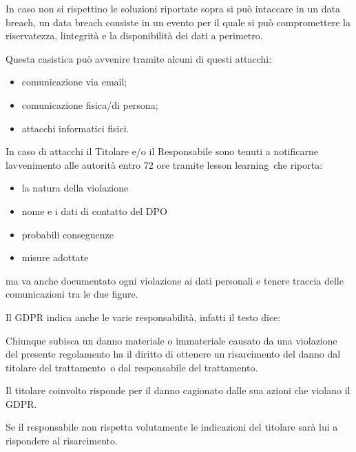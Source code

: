 \documentclass[
]{article}
\providecommand{\tightlist}{%
  \setlength{\itemsep}{0pt}\setlength{\parskip}{0pt}}
\begin{document}
{}

{In caso non si rispettino le soluzioni riportate sopra si può intaccare
in un data breach, un data breach consiste in un evento per il quale si
può compromettere la riservatezza, l\textquotesingle integrità e la
disponibilità dei dati a perimetro. }

{Questa casistica può avvenire tramite alcuni di questi attacchi:}

\begin{itemize}
\tightlist
\item
  {comunicazione via email}{;}
\item
  {comunicazione fisica/di persona}{;}
\item
  {attacchi informatici fisici}{.}
\end{itemize}

{}

{In caso di attacchi il Titolare e/o il Responsabile sono tenuti a
notificarne l\textquotesingle avvenimento alle autorità entro 72 ore
tramite }{lesson learning}{~che riporta:}

\begin{itemize}
\tightlist
\item
  {la natura della violazione }
\item
  {nome e i dati di contatto del DPO }
\item
  {probabili conseguenze }
\item
  {misure adottate }
\end{itemize}

{ma va anche documentato ogni violazione ai dati personali e tenere
traccia delle comunicazioni tra le due figure.}

{}

{Il GDPR indica anche le varie responsabilità, infatti il testo dice:}

{}

{Chiunque subisca un danno materiale o immateriale causato da una
violazione del presente regolamento ha il diritto di ottenere un
risarcimento del danno dal }{titolare del trattamento}{~o dal
}{responsabile del trattamento}{.}

{}

{Il }{titolare }{coinvolto risponde per il danno cagionato dalle sua
azioni che violano il GDPR.}

{Se il }{responsabile }{non rispetta volutamente le indicazioni del
titolare sarà lui a rispondere al risarcimento.}

{}

{}
\end{document}
